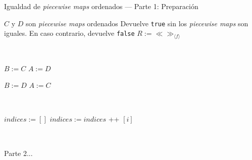\begin{algorithm}
\caption{Igualdad de \textit{piecewise maps} ordenados — Parte 1: Preparación}
\label{alg:igualdad-ord1}
\begin{algorithmic}[1]
\Require $C$ y $D$ son \textit{piecewise maps} ordenados
\Ensure Devuelve \texttt{true} sin los \textit{piecewise maps} son iguales. En caso contrario, devuelve \texttt{false}
    \State $R := \ll\gg_{\langle f \rangle}$

        \State {}
    \EndIf

        \State {}
    \EndIf
          
    \
    
    \State $B := C$
    \State $A := D$

        \State $B := D$
        \State $A := C$
    \EndIf
        
    \
    
    \State $indices := []$ 
        \State $indices := indices$  \!+\!+  $[i]$
    \EndFor
        
    \

    \State Parte 2...
\EndFunction
\end{algorithmic}
\end{algorithm}

